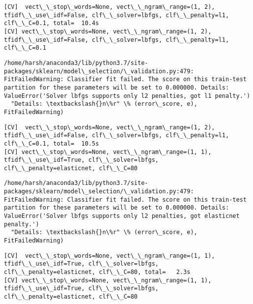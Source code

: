\documentclass[11pt]{article}
\begin{document}
    \begin{Verbatim}[commandchars=\\\{\}]
[CV]  vect\_\_stop\_words=None, vect\_\_ngram\_range=(1, 2), tfidf\_\_use\_idf=False, clf\_\_solver=lbfgs, clf\_\_penalty=l1, clf\_\_C=0.1, total=  10.4s
[CV] vect\_\_stop\_words=None, vect\_\_ngram\_range=(1, 2), tfidf\_\_use\_idf=False, clf\_\_solver=lbfgs, clf\_\_penalty=l1, clf\_\_C=0.1 

    \end{Verbatim}

    \begin{Verbatim}[commandchars=\\\{\}]
/home/harsh/anaconda3/lib/python3.7/site-packages/sklearn/model\_selection/\_validation.py:479: FitFailedWarning: Classifier fit failed. The score on this train-test partition for these parameters will be set to 0.000000. Details: 
ValueError('Solver lbfgs supports only l2 penalties, got l1 penalty.')
  "Details: \textbackslash{}n\%r" \% (error\_score, e), FitFailedWarning)

    \end{Verbatim}

    \begin{Verbatim}[commandchars=\\\{\}]
[CV]  vect\_\_stop\_words=None, vect\_\_ngram\_range=(1, 2), tfidf\_\_use\_idf=False, clf\_\_solver=lbfgs, clf\_\_penalty=l1, clf\_\_C=0.1, total=  10.5s
[CV] vect\_\_stop\_words=None, vect\_\_ngram\_range=(1, 1), tfidf\_\_use\_idf=True, clf\_\_solver=lbfgs, clf\_\_penalty=elasticnet, clf\_\_C=80 

    \end{Verbatim}

    \begin{Verbatim}[commandchars=\\\{\}]
/home/harsh/anaconda3/lib/python3.7/site-packages/sklearn/model\_selection/\_validation.py:479: FitFailedWarning: Classifier fit failed. The score on this train-test partition for these parameters will be set to 0.000000. Details: 
ValueError('Solver lbfgs supports only l2 penalties, got elasticnet penalty.')
  "Details: \textbackslash{}n\%r" \% (error\_score, e), FitFailedWarning)

    \end{Verbatim}

    \begin{Verbatim}[commandchars=\\\{\}]
[CV]  vect\_\_stop\_words=None, vect\_\_ngram\_range=(1, 1), tfidf\_\_use\_idf=True, clf\_\_solver=lbfgs, clf\_\_penalty=elasticnet, clf\_\_C=80, total=   2.3s
[CV] vect\_\_stop\_words=None, vect\_\_ngram\_range=(1, 1), tfidf\_\_use\_idf=True, clf\_\_solver=lbfgs, clf\_\_penalty=elasticnet, clf\_\_C=80 

    \end{Verbatim}
\end{document}
